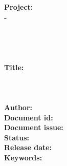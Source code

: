 \documentclass[11pt,a4paper]{report}
\begin{document}
\pagestyle{empty}



\bf Project: \\
\bf \Large \subdmsproj   -   \subdmsdesc \\
\\
\\
\\
\\
\bf Title: \\
\bf \Large \subdmstitle \\
\\

\\
\bf Author: 
\subdmsauthor \\
Document id: \subdmsdocid \\
Document issue: \subdmsissue \\ 
Status: \subdmsstatus \\
Release date: \subdmsrdate \\

Keywords: \\
\subdmskeyw \\

\end{document}
